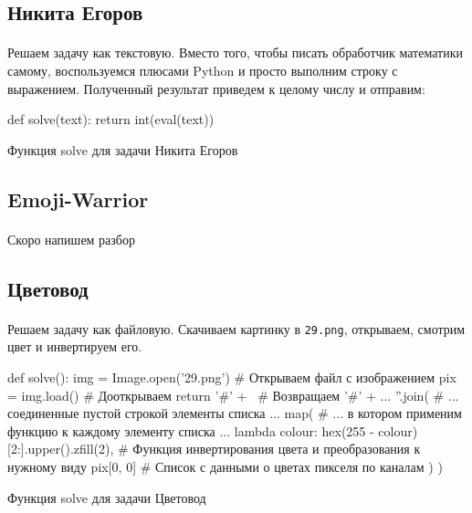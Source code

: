 \documentclass[12pt]{article}
\begin{document}
    \subsection{Никита Егоров}
    \paragraph{}
    Решаем задачу как текстовую.
    Вместо того, чтобы писать обработчик математики самому, воспользуемся плюсами Python и просто выполним
    строку с выражением.
    Полученный результат приведем к целому числу и отправим:
    \begin{listing}[H]
        \begin{pythoncode}
def solve(text):
    return int(eval(text))
        \end{pythoncode}
        \label{lst:solve6}
        \caption{Функция solve для задачи Никита Егоров}
    \end{listing}

    \subsection{Emoji-Warrior}
    \paragraph{}
    Скоро напишем разбор

    \subsection{Цветовод}
    \paragraph{}
    Решаем задачу как файловую.
    Скачиваем картинку в \verb|29.png|, открываем, смотрим цвет и инвертируем его.
    \begin{listing}[H]
        \begin{pythoncode}
def solve():
    img = Image.open('29.png')   # Открываем файл с изображением
    pix = img.load()             # Дооткрываем
    return '#' + \               # Возвращаем '#' + ...
           ''.join(              # ... соединенные пустой строкой элементы списка ...
               map(              # ... в котором применим функцию к каждому элементу списка ...
                   lambda colour: hex(255 - colour)[2:].upper().zfill(2),
                                 # Функция инвертирования цвета и преобразования к нужному виду
                   pix[0, 0]     # Список с данными о цветах пикселя по каналам
               )
           )
        \end{pythoncode}
        \label{lst:solve29}
        \caption{Функция solve для задачи Цветовод}
    \end{listing}
\end{document}
